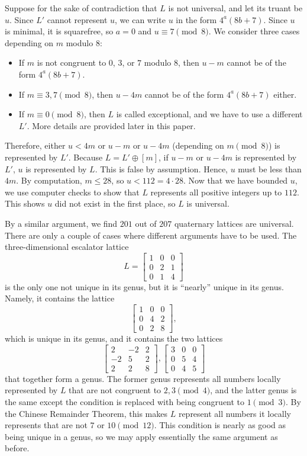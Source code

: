 \documentclass{article}
\begin{document}
Suppose for the sake of contradiction that $L$ is not universal, and let its truant be $u$. Since $L'$ cannot represent $u$, we can write $u$ in the form $4^a (8b + 7)$. Since $u$ is minimal, it is squarefree, so $a = 0$ and $u \equiv 7 \pmod 8$. We consider three cases depending on $m$ modulo $8$:
\begin{itemize}
    \item If $m$ is not congruent to $0$, $3$, or $7$ modulo $8$, then $u-m$ cannot be of the form $4^a (8b + 7)$.
    \item If $m \equiv 3, 7 \pmod 8$, then $u-4m$ cannot be of the form $4^a (8b + 7)$ either.
    \item If $m \equiv 0 \pmod 8$, then $L$ is called exceptional, and we have to use a different $L'$. More details are provided later in this paper.
\end{itemize}

Therefore, either $u < 4m$ or $u - m$ or $u - 4m$ (depending on $m \pmod 8$) is represented by $L'$. Because $L = L' \oplus [m]$, if $u - m$ or $u - 4m$ is represented by $L'$, $u$ is represented by $L$. This is false by assumption. Hence, $u$ must be less than $4m$. By computation, $m \le 28$, so $u < 112 = 4 \cdot 28$. Now that we have bounded $u$, we use computer checks to show that $L$ represents all positive integers up to $112$. This shows $u$ did not exist in the first place, so $L$ is universal.

By a similar argument, we find $201$ out of $207$ quaternary lattices are universal. There are only a couple of cases where different arguments have to be used. The three-dimensional escalator lattice
\[L = \begin{bmatrix} 1 & 0 & 0 \\ 0 & 2 & 1 \\ 0 & 1 & 4 \end{bmatrix}\]
is the only one not unique in its genus, but it is ``nearly'' unique in its genus. Namely, it contains the lattice
\[\begin{bmatrix} 1 & 0 & 0 \\ 0 & 4 & 2 \\ 0 & 2 & 8 \end{bmatrix},\]
which is unique in its genus, and it contains the two lattices
\[\begin{bmatrix} 2 & -2 & 2 \\ -2 & 5 & 2 \\ 2 & 2 & 8 \end{bmatrix}, \begin{bmatrix} 3 & 0 & 0 \\ 0 & 5 & 4 \\ 0 & 4 & 5 \end{bmatrix}\]
that together form a genus. The former genus represents all numbers locally represented by $L$ that are not congruent to $2, 3 \pmod 4$, and the latter genus is the same except the condition is replaced with being congruent to $1 \pmod 3$. By the Chinese Remainder Theorem, this makes $L$ represent all numbers it locally represents that are not $7$ or $10 \pmod{12}$. This condition is nearly as good as being unique in a genus, so we may apply essentially the same argument as before.
\end{document}
